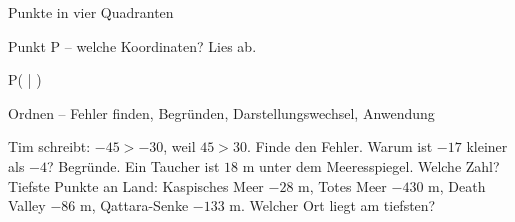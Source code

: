 \begin{aufgabe}{Punkte in vier Quadranten}
\begin{teile}
\teil Punkt P – welche Koordinaten? Lies ab.

\begin{ksys}[xmin=-5,xmax=5,ymin=-5,ymax=5,ablesen]  \end{ksys}
P( \leerfeld | \leerfeld )
\end{teile}
\end{aufgabe}

\begin{aufgabe}{Ordnen – Fehler finden, Begründen, Darstellungswechsel, Anwendung}
\begin{teile}
\teil Tim schreibt: $-45 > -30$, weil $45 > 30$. Finde den Fehler.
\teil Warum ist $-17$ kleiner als $-4$? Begründe.
\teil Ein Taucher ist $18$ m unter dem Meeresspiegel. Welche Zahl? \leerfeld[m]
\teil Tiefste Punkte an Land: Kaspisches Meer $-28$ m, Totes Meer $-430$ m, Death Valley $-86$ m, Qattara-Senke $-133$ m. Welcher Ort liegt am tiefsten?
\end{teile}
\end{aufgabe}
